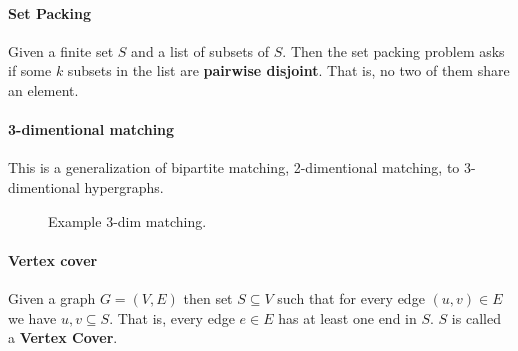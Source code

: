 \documentclass[12pt]{article} %
\begin{document}
\paragraph{Set Packing}
Given a finite set $S$ and a list of subsets of $S$. Then the set packing problem asks if some $k$ subsets in the list are \textbf{pairwise disjoint}. That is, no two of them share an element. 

\paragraph{3-dimentional matching}
This is a generalization of bipartite matching, 2-dimentional matching, to 3-dimentional hypergraphs.

\begin{figure}[H]
\caption{Example 3-dim matching.}
\label{3dim}
\end{figure} 

\paragraph{Vertex cover}
Given a graph $G = (V, E)$ then set $S \subseteq V$ such that for every edge $(u, v) \in E$ we have ${u, v} \subseteq S$. That is, every edge $e \in E$ has at least one end in $S$. $S$ is called a \textbf{Vertex Cover}.
\end{document}
